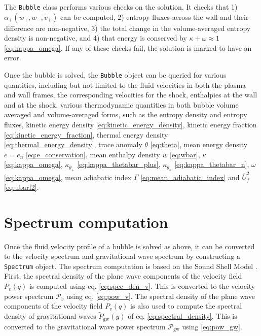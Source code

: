 The \verb|Bubble| class performs various checks on the solution.
It checks that
1) $\alpha_+(w_+, w_-, \tilde{v}_+)$ can be computed,
2) entropy fluxes across the wall and their difference are non-negative,
3) the total change in the volume-averaged entropy density is non-negative, and
4) that energy is conserved by $\kappa + \omega \approx 1$ \eqref{eq:kappa_omega}.
If any of these checks fail, the solution is marked to have an error.

Once the bubble is solved, the \verb|Bubble| object can be queried for various quantities,
including but not limited to the fluid velocities in both the plasma and wall frames,
the corresponding velocities for the shock,
enthalpies at the wall and at the shock,
various thermodynamic quantities in both bubble volume averaged and volume-averaged forms,
such as the entropy density and entropy fluxes,
kinetic energy density \eqref{eq:kinetic_energy_density},
kinetic energy fraction \eqref{eq:kinetic_energy_fraction},
thermal energy density \eqref{eq:thermal_energy_density},
trace anomaly $\theta$ \eqref{eq:theta},
mean energy density $\bar{e} = e_n$ \eqref{eq:e_conservation},
mean enthalpy density $\bar{w}$ \eqref{eq:wbar},
$\kappa$ \eqref{eq:kappa_omega},
$\kappa_{\bar{\theta}_+}$ \eqref{eq:kappa_thetabar_plus},
$\kappa_{\bar{\theta}_n}$ \eqref{eq:kappa_thetabar_n},
$\omega$ \eqref{eq:kappa_omega},
mean adiabatic index $\Gamma$ \eqref{eq:mean_adiabatic_index} and
$\bar{U}_f^2$ \eqref{eq:ubarf2}.


\section{Spectrum computation}
Once the fluid velocity profile of a bubble is solved as above,
it can be converted to the velocity spectrum and gravitational wave spectrum by constructing a \verb|Spectrum| object.
The spectrum computation is based on the Sound Shell Model \cite{hindmarsh_gw_pt_2019}.
First, the spectral density of the plane wave components of the velocity field $P_v(q)$ is computed using eq. \eqref{eq:spec_den_v}.
This is converted to the velocity power spectrum $\mathcal{P}_{\tilde{v}}$ using eq. \eqref{eq:pow_v}.
The spectral density of the plane wave components of the velocity field $P_v(q)$ is also used to compute the spectral density of gravitational waves $\tilde{P}_{\text{gw}}(y)$ of eq. \eqref{eq:spectral_density}.
This is converted to the gravitational wave power spectrum $\mathcal{P}_{\text{gw}}$ using \eqref{eq:pow_gw}.


